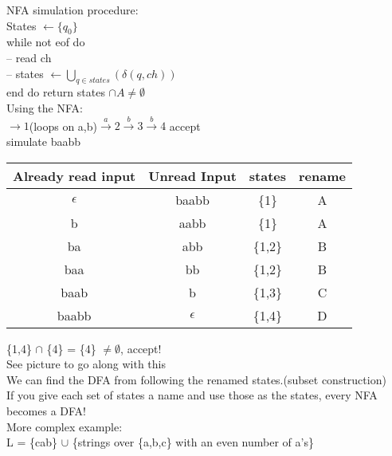\documentclass[12pt]{article}
\begin{document}
	NFA simulation procedure:\\
	States $\leftarrow \{q_0\}$\\
	while not eof do\\
	-- read ch\\
	-- states $\leftarrow \bigcup_{q \in states}(\delta(q,ch))$\\
	end do
	return states $\cap A \neq \emptyset$\\
	
	Using the NFA:\\
	$\rightarrow 1$(loops on a,b)$ \overset{a}{\rightarrow} 2 \overset{b}{\rightarrow} 3 \overset{b}{\rightarrow} 4$ accept\\
	simulate baabb\\
	\begin{tabular}{c | c | c c}
		Already read input & Unread Input & states & rename \\ \hline
		$\epsilon$ & baabb & \{1\} & A\\
		b & aabb & \{1\} & A\\
		ba & abb & \{1,2\} & B\\
		baa & bb & \{1,2\} & B\\
		baab & b & \{1,3\} & C\\
		baabb & $\epsilon$ & \{1,4\} & D\\
	\end{tabular}
	
	\{1,4\} $\cap$ \{4\} = \{4\} $\neq \emptyset$, accept!\\
	See picture to go along with this\\
	We can find the DFA from following the renamed states.(subset construction)\\
	If you give each set of states a name and use those as the states, every NFA becomes a DFA!\\
	
	More complex example:\\
	
	L = \{cab\} $\cup$ \{strings over \{a,b,c\} with an even number of a's\}\\
	
	
	
	
	
	
	
	
\end{document}
